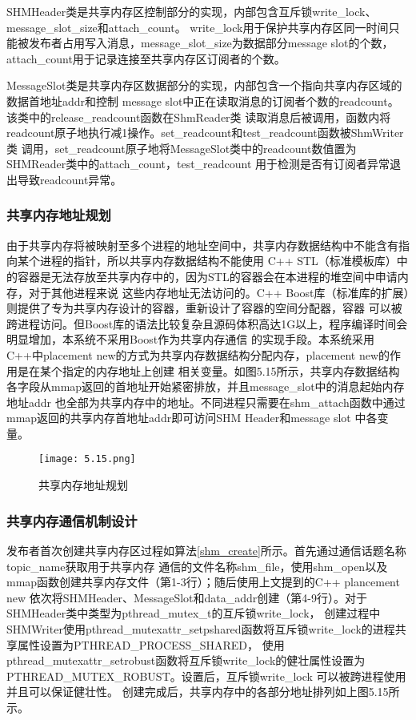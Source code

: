 SHMHeader类是共享内存区控制部分的实现，内部包含互斥锁write\_lock、message\_slot\_size和attach\_count。
write\_lock用于保护共享内存区同一时间只能被发布者占用写入消息，message\_slot\_size为数据部分message slot的个数，
attach\_count用于记录连接至共享内存区订阅者的个数。

MessageSlot类是共享内存区数据部分的实现，内部包含一个指向共享内存区域的数据首地址addr和控制
message slot中正在读取消息的订阅者个数的readcount。该类中的release\_readcount函数在ShmReader类
读取消息后被调用，函数内将readcount原子地执行减1操作。set\_readcount和test\_readcount函数被ShmWriter类
调用，set\_readcount原子地将MessageSlot类中的readcount数值置为SHMReader类中的attach\_count，test\_readcount
用于检测是否有订阅者异常退出导致readcount异常。

\subsubsection{共享内存地址规划}
由于共享内存将被映射至多个进程的地址空间中，共享内存数据结构中不能含有指向某个进程的指针，所以共享内存数据结构不能使用
C++ STL（标准模板库）中的容器是无法存放至共享内存中的，因为STL的容器会在本进程的堆空间中申请内存，对于其他进程来说
这些内存地址无法访问的。C++ Boost库（标准库的扩展）则提供了专为共享内存设计的容器，重新设计了容器的空间分配器，容器
可以被跨进程访问。但Boost库的语法比较复杂且源码体积高达1G以上，程序编译时间会明显增加，本系统不采用Boost作为共享内存通信
的实现手段。本系统采用C++中placement new的方式为共享内存数据结构分配内存，placement new的作用是在某个指定的内存地址上创建
相关变量。如图5.15所示，共享内存数据结构各字段从mmap返回的首地址开始紧密排放，并且message\_slot中的消息起始内存地址addr
也全部为共享内存中的地址。不同进程只需要在shm\_attach函数中通过mmap返回的共享内存首地址addr即可访问SHM Header和message slot
中各变量。
\begin{figure}[H]
  \centering
  \texttt{[image: 5.15.png]}
  \caption{共享内存地址规划}
  \label{fig:11}
\end{figure}

\subsubsection{共享内存通信机制设计}
发布者首次创建共享内存区过程如算法\ref{shm_create}所示。首先通过通信话题名称topic\_name获取用于共享内存
通信的文件名称shm\_file，使用shm\_open以及mmap函数创建共享内存文件（第1-3行）；随后使用上文提到的C++ plancement new
依次将SHMHeader、MessageSlot和data\_addr创建（第4-9行）。对于SHMHeader类中类型为pthread\_mutex\_t的互斥锁write\_lock，
创建过程中SHMWriter使用pthread\_mutexattr\_setpshared函数将互斥锁write\_lock的进程共享属性设置为PTHREAD\_PROCESS\_SHARED，
使用pthread\_mutexattr\_setrobust函数将互斥锁write\_lock的健壮属性设置为PTHREAD\_MUTEX\_ROBUST。设置后，互斥锁write\_lock
可以被跨进程使用并且可以保证健壮性。
创建完成后，共享内存中的各部分地址排列如上图5.15所示。

